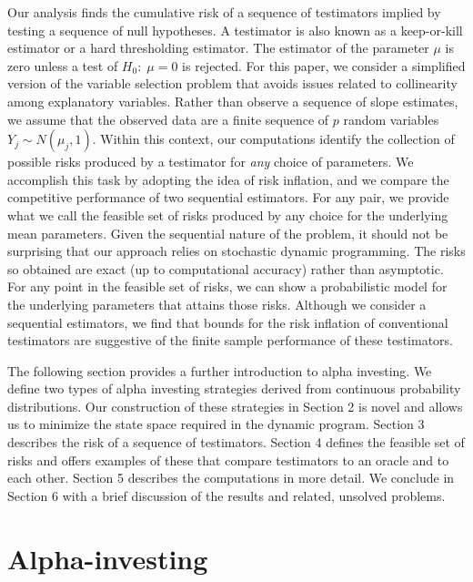 \documentclass[12pt]{article}
\begin{document}
 Our analysis finds the cumulative risk of a sequence of testimators implied by
 testing a sequence of null hypotheses.  A testimator is also known as a
 keep-or-kill estimator or a hard thresholding estimator.  The estimator of the
 parameter $\mu$ is zero unless a test of $H_0: \; \mu = 0$ is rejected.  For
 this paper, we consider a simplified version of the variable selection problem
 that avoids issues related to collinearity among explanatory variables.  Rather
 than observe a sequence of slope estimates, we assume that the observed data
 are a finite sequence of $p$ random variables $Y_j \sim N(\mu_j,1)$.  Within
 this context, our computations identify the collection of possible risks
 produced by a testimator for {\em any} choice of parameters.  We accomplish
 this task by adopting the idea of risk inflation, and we compare the
 competitive performance of two sequential estimators.  For any pair, we provide
 what we call the feasible set of risks produced by any choice for the
 underlying mean parameters.  Given the sequential nature of the problem, it
 should not be surprising that our approach relies on stochastic dynamic
 programming.  The risks so obtained are exact (up to computational accuracy)
 rather than asymptotic.  For any point in the feasible set of risks, we can
 show a probabilistic model for the underlying parameters that attains those
 risks.  Although we consider a sequential estimators, we find that bounds for
 the risk inflation of conventional testimators are suggestive of the finite
 sample performance of these testimators.


 The following section provides a further introduction to alpha investing.  We
 define two types of alpha investing strategies derived from continuous
 probability distributions.  Our construction of these strategies in Section 2
 is novel and allows us to minimize the state space required in the dynamic
 program.  Section 3 describes the risk of a sequence of testimators.  Section 4
 defines the feasible set of risks and offers examples of these that compare
 testimators to an oracle and to each other.  Section 5 describes the
 computations in more detail.  We conclude in Section 6 with a brief discussion
 of the results and related, unsolved problems.



\section{ Alpha-investing }
\end{document}
